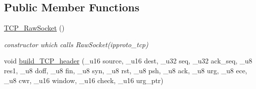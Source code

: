 \subsection*{Public Member Functions}
\begin{CompactItemize}
\item 
\hypertarget{classsocketpp_1_1TCP__RawSocket_f0b76c8fdc293bb5e22914b247b1e7b8}{
\hyperlink{classsocketpp_1_1TCP__RawSocket_f0b76c8fdc293bb5e22914b247b1e7b8}{TCP\_\-RawSocket} ()}
\label{classsocketpp_1_1TCP__RawSocket_f0b76c8fdc293bb5e22914b247b1e7b8}

\begin{CompactList}\small\item\em constructor which calls RawSocket(ipproto\_\-tcp) \item\end{CompactList}\item 
\hypertarget{classsocketpp_1_1TCP__RawSocket_443f8b89224427ae95d22b9b305a4990}{
void \hyperlink{classsocketpp_1_1TCP__RawSocket_443f8b89224427ae95d22b9b305a4990}{build\_\-TCP\_\-header} (\_\-u16 source, \_\-u16 dest, \_\-u32 seq, \_\-u32 ack\_\-seq, \_\-u8 res1, \_\-u8 doff, \_\-u8 fin, \_\-u8 syn, \_\-u8 rst, \_\-u8 psh, \_\-u8 ack, \_\-u8 urg, \_\-u8 ece, \_\-u8 cwr, \_\-u16 window, \_\-u16 check, \_\-u16 urg\_\-ptr)}
\label{classsocketpp_1_1TCP__RawSocket_443f8b89224427ae95d22b9b305a4990}


\end{CompactItemize}

